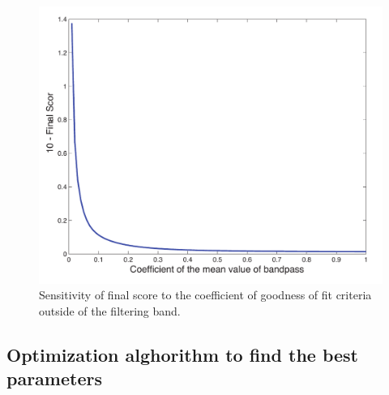 \documentclass{article}
\begin{document}
\begin{figure} [H]
\begin{center}  
\includegraphics[scale=0.3]{figures/pdf/figure6.pdf} 
\caption{Sensitivity of final score to the coefficient of  goodness of fit criteria outside of the filtering band.}
\end{center}   
\end{figure}



\subsection{Optimization alghorithm to find the best parameters}
\end{document}
